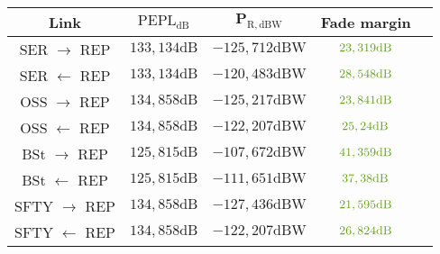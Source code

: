 \footnotesize
\begin{tabular}{|c|c|c|c|c|}
	\hline
	\textbf{Link} & $\boldsymbol{\mathrm{PEPL}_\mathrm{dB}}$ & $\boldsymbol{P_\mathrm{R,dBW}}$ & \textbf{Fade margin} \\
	\hline
	SER $\rightarrow$ REP & $133,134\mathrm{dB}$ & $-125,712\mathrm{dBW}$ & $\color{rgb, 255:red, 101; green, 162; blue, 30 }23,319\mathrm{dB}$ \\
	SER $\leftarrow$ REP & $133,134\mathrm{dB}$ & $-120,483\mathrm{dBW}$ & $\color{rgb, 255:red, 101; green, 162; blue, 30 }28,548\mathrm{dB}$ \\
	OSS $\rightarrow$ REP & $134,858\mathrm{dB}$ & $-125,217\mathrm{dBW}$ & $\color{rgb, 255:red, 101; green, 162; blue, 30 }23,841\mathrm{dB}$ \\
	OSS $\leftarrow$ REP & $134,858\mathrm{dB}$ & $-122,207\mathrm{dBW}$ & $\color{rgb, 255:red, 101; green, 162; blue, 30 }25,24\mathrm{dB}$ \\
	BSt $\rightarrow$ REP & $125,815\mathrm{dB}$ & $-107,672\mathrm{dBW}$ & $\color{rgb, 255:red, 101; green, 162; blue, 30 }41,359\mathrm{dB}$ \\
	BSt $\leftarrow$ REP & $125,815\mathrm{dB}$ & $-111,651\mathrm{dBW}$ & $\color{rgb, 255:red, 101; green, 162; blue, 30 }37,38\mathrm{dB}$ \\
	SFTY $\rightarrow$ REP & $134,858\mathrm{dB}$ & $-127,436\mathrm{dBW}$ & $\color{rgb, 255:red, 101; green, 162; blue, 30 }21,595\mathrm{dB}$ \\
	SFTY $\leftarrow$ REP &  $134,858\mathrm{dB}$& $-122,207\mathrm{dBW}$ & $\color{rgb, 255:red, 101; green, 162; blue, 30 }26,824\mathrm{dB}$ \\
	\hline
\end{tabular}